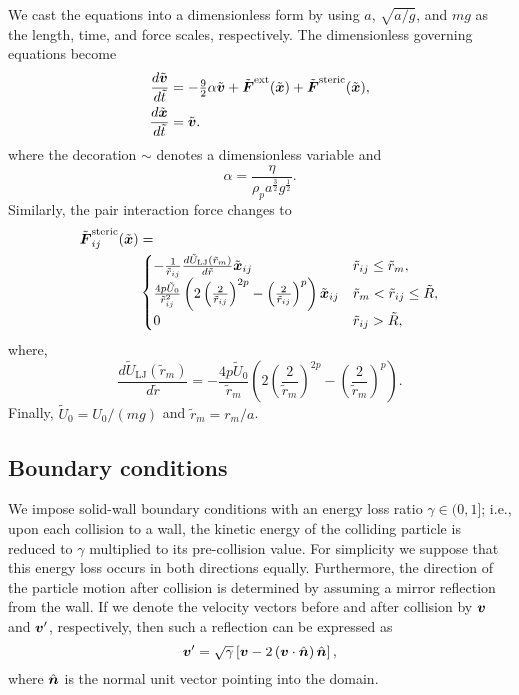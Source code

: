 \documentclass[letterpaper, 11pt]{article}
\begin{document}
We cast the equations into a dimensionless form by using $a$, $\sqrt{a/g}$, and $mg$ as the length, time, and force scales, respectively. The dimensionless governing equations become
\begin{subequations}
  \begin{align}
    \frac{d\tilde{\boldsymbol{v}}}{d\tilde{t}}&=-\tfrac{9}{2}\alpha\tilde{\boldsymbol{v}}+\tilde{\boldsymbol{F}}^{\text{ext}}(\tilde{\boldsymbol{x}})+\tilde{\boldsymbol{F}}^{\text{steric}}(\tilde{\boldsymbol{x}}),\\
    \frac{d\tilde{\boldsymbol{x}}}{d\tilde{t}}&=\tilde{\boldsymbol{v}}.
  \end{align}
  \label{eq:equation-motion-dimensionless}%
\end{subequations}
where the decoration $\sim$ denotes a dimensionless variable and
\begin{equation}
  \alpha=\frac{\eta}{\rho_pa^{\tfrac{3}{2}}g^{\tfrac{1}{2}}}.
  \label{eq:dl-params}
\end{equation}
Similarly, the pair interaction force changes to
\begin{align}
  \tilde{\boldsymbol{F}}^{\text{steric}}_{ij}(\tilde{\boldsymbol{x}})&=\nonumber\\
  &\begin{cases}
    -\frac{1}{\tilde{r}_{ij}}\frac{d\tilde{U}_{\mathrm{LJ}}(\tilde{r}_m)}{d\tilde{r}}\tilde{\boldsymbol{x}}_{ij} & \tilde{r}_{ij}\leq \tilde{r}_m,\\
    \frac{4p\tilde{U}_0}{\tilde{r}_{ij}^2}\left(2\left(\frac{2}{\tilde{r}_{ij}}\right)^{2p}-\left(\frac{2}{\tilde{r}_{ij}}\right)^p\right)\tilde{\boldsymbol{x}}_{ij} & \tilde{r}_m<\tilde{r}_{ij}\leq \tilde{R},\\
    0 & \tilde{r}_{ij}>\tilde{R},
  \end{cases}
  \label{Eq:StericForce-dimensionless}
\end{align}
where,
\begin{equation}
  \frac{d\tilde{U}_{\mathrm{LJ}}(\tilde{r}_m)}{d\tilde{r}}=-\frac{4p\tilde{U}_0}{\tilde{r}_m}\left(2\left(\frac{2}{\tilde{r}_m}\right)^{2p}-\left(\frac{2}{\tilde{r}_m}\right)^p\right).
\end{equation}
Finally, $\tilde{U}_0=U_0/(mg)$ and $\tilde{r}_m=r_m/a$.

\subsection{Boundary conditions}
We impose solid-wall boundary conditions with an energy loss ratio $\gamma\in(0,1]$; i.e., upon each collision to a wall, the kinetic energy of the colliding particle is reduced to $\gamma$ multiplied to its pre-collision value. For simplicity we suppose that this energy loss occurs in both directions equally. Furthermore, the direction of the particle motion after collision is determined by assuming a mirror reflection from the wall. If we denote the velocity vectors before and after collision by $\boldsymbol{v}$ and $\boldsymbol{v}'$, respectively, then such a reflection can be expressed as
\begin{equation}
  \boldsymbol{v}'=\sqrt{\gamma}\left[\boldsymbol{v}-2\left(\boldsymbol{v}\cdot\hat{\boldsymbol{n}}\right)\hat{\boldsymbol{n}}\right],
\end{equation}
where $\hat{\boldsymbol{n}}$ is the normal unit vector pointing into the domain.
\end{document}
